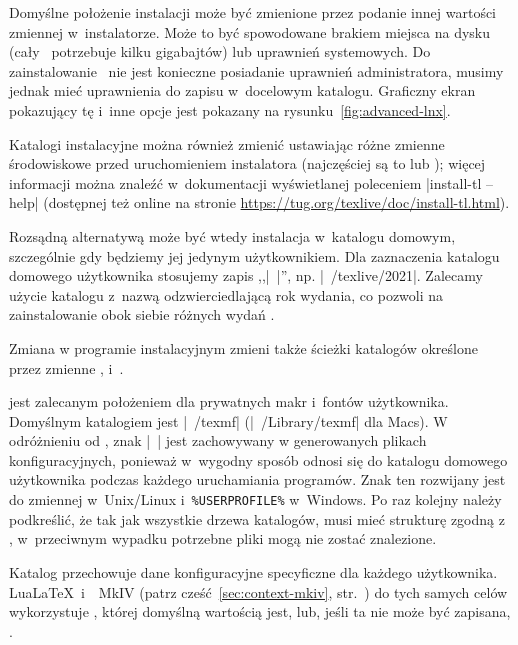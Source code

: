\documentclass{article}
\begin{document}
Domyślne położenie instalacji  może być zmienione przez podanie innej wartości
zmiennej   w~instalatorze. Może to być spowodowane  brakiem
miejsca na dysku (cały \TL\ potrzebuje kilku gigabajtów) lub uprawnień systemowych.
Do zainstalowanie \TL\ nie jest konieczne posiadanie uprawnień administratora,
musimy jednak mieć uprawnienia do zapisu w~docelowym katalogu.
Graficzny ekran pokazujący tę i~inne opcje jest pokazany na rysunku~\ref{fig:advanced-lnx}.


Katalogi instalacyjne można również zmienić ustawiając różne
zmienne środowiskowe przed uruchomieniem instalatora (najczęściej są to
 lub
); więcej informacji można znaleźć w~dokumentacji
wyświetlanej poleceniem |install-tl --help| (dostępnej też online na stronie
\url{https://tug.org/texlive/doc/install-tl.html}).

Rozsądną alternatywą może być wtedy instalacja
w~katalogu domowym, szczególnie gdy będziemy jej jedynym użytkownikiem.
Dla zaznaczenia katalogu domowego użytkownika stosujemy  zapis ,,|~|'', np.
|~/texlive/2021|. Zalecamy użycie katalogu z~nazwą odzwierciedlającą
rok wydania, co pozwoli na zainstalowanie obok siebie różnych wydań \TL{}.

Zmiana  w programie instalacyjnym zmieni także  ścieżki
katalogów określone przez zmienne , 
i~.

 jest zalecanym położeniem dla prywatnych makr i~fontów
użytkownika. Domyślnym katalogiem jest |~/texmf|  (|~/Library/texmf| dla
Macs). W odróżnieniu od
, znak |~| jest zachowywany w generowanych plikach
konfiguracyjnych, ponieważ w~wygodny sposób odnosi się  do katalogu domowego
użytkownika podczas każdego uruchamiania programów. Znak ten rozwijany jest
do zmiennej  w~Unix/Linux i~\verb|%USERPROFILE%| w~Windows. Po
raz kolejny należy  podkreślić, że tak jak wszystkie drzewa katalogów,
 musi mieć strukturę zgodną z \TDS, w~przeciwnym wypadku
potrzebne pliki mogą nie zostać znalezione.

Katalog    przechowuje dane
konfiguracyjne specyficzne dla każdego użytkownika.
Lua\LaTeX\ i~\ConTeXt\ MkIV (patrz cześć~\ref{sec:context-mkiv},
str.~\pageref{sec:context-mkiv})  do tych samych celów wykorzystuje
, której domyślną wartością jest,
lub, jeśli ta nie może być zapisana, .
\end{document}
